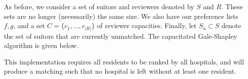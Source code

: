 As before, we consider a set of suitors and reviewers denoted by \(S\) and 
\(R\). These sets are no longer (necessarily) the same size. We also have our 
preference lists \(f, g\), and a set \(C = \{c_1, \ldots, c_{|R|}\}\) of 
reviewer capacities. Finally, let \(S_u \subset S\) denote the set of suitors 
that are currently unmatched. The capacitated Gale-Shapley algorithm is given 
below.

\begin{singlespace}
    
\end{singlespace}

\begin{remark}
	This implementation requires all residents to be ranked by all hospitals, 
    and will produce a matching such that no hospital is left without at least 
    one resident.
\end{remark}
